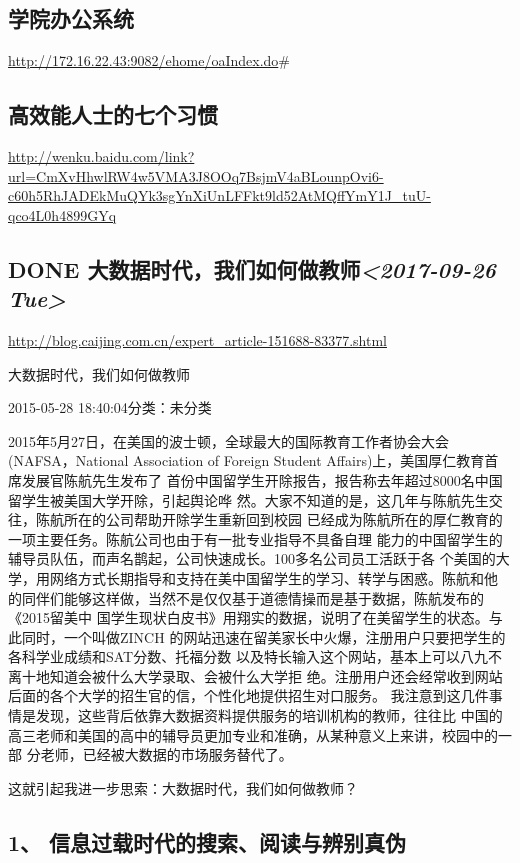 \documentclass[11pt]{ctexart}
\begin{document}
{{{{\subsection{学院办公系统}
\label{sec:orged62c80}
\url{http://172.16.22.43:9082/ehome/oaIndex.do}\#
\subsection{高效能人士的七个习惯}
\label{sec:org098885b}
\url{http://wenku.baidu.com/link?url=CmXvHhwlRW4w5VMA3J8OOq7BsjmV4aBLounpOvi6-c60h5RhJADEkMuQYk3sgYnXiUnLFFkt9ld52AtMQffYmY1J\_tuU-qco4L0h4899GYq}

\subsection{{\bfseries\sffamily DONE} 大数据时代，我们如何做教师\textit{<2017-09-26 Tue>}}
\label{sec:org96fb139}
\url{http://blog.caijing.com.cn/expert\_article-151688-83377.shtml}

大数据时代，我们如何做教师

2015-05-28 18:40:04分类：未分类

2015年5月27日，在美国的波士顿，全球最大的国际教育工作者协会大会(NAFSA，National
Association of Foreign Student Affairs)上，美国厚仁教育首席发展官陈航先生发布了
首份中国留学生开除报告，报告称去年超过8000名中国留学生被美国大学开除，引起舆论哗
然。大家不知道的是，这几年与陈航先生交往，陈航所在的公司帮助开除学生重新回到校园
已经成为陈航所在的厚仁教育的一项主要任务。陈航公司也由于有一批专业指导不具备自理
能力的中国留学生的辅导员队伍，而声名鹊起，公司快速成长。100多名公司员工活跃于各
个美国的大学，用网络方式长期指导和支持在美中国留学生的学习、转学与困惑。陈航和他
的同伴们能够这样做，当然不是仅仅基于道德情操而是基于数据，陈航发布的《2015留美中
国学生现状白皮书》用翔实的数据，说明了在美留学生的状态。与此同时，一个叫做ZINCH
的网站迅速在留美家长中火爆，注册用户只要把学生的各科学业成绩和SAT分数、托福分数
以及特长输入这个网站，基本上可以八九不离十地知道会被什么大学录取、会被什么大学拒
绝。注册用户还会经常收到网站后面的各个大学的招生官的信，个性化地提供招生对口服务。
我注意到这几件事情是发现，这些背后依靠大数据资料提供服务的培训机构的教师，往往比
中国的高三老师和美国的高中的辅导员更加专业和准确，从某种意义上来讲，校园中的一部
分老师，已经被大数据的市场服务替代了。

这就引起我进一步思索：大数据时代，我们如何做教师？

\subsection{1、 信息过载时代的搜索、阅读与辨别真伪}
\label{sec:orga3b2930}

}}}}
\end{document}
